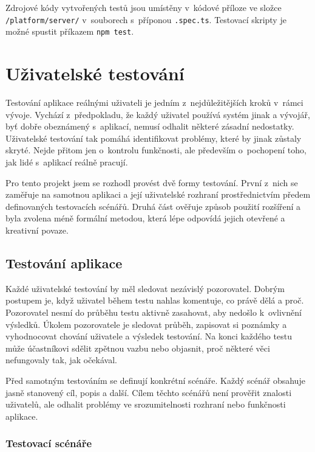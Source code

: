 Zdrojové kódy vytvořených testů jsou umístěny v~kódové příloze ve složce \texttt{/platform/server/} v~souborech s~příponou \verb|.spec.ts|.
Testovací skripty je možné spustit příkazem \verb|npm test|.


\section{Uživatelské testování}

Testování aplikace reálnými uživateli je jedním z~nejdůležitějších kroků v~rámci vývoje. 
Vychází z~předpokladu, že každý uživatel používá systém jinak a vývojář, byť dobře obeznámený s~aplikací, nemusí odhalit některé zásadní nedostatky. 
Uživatelské testování tak pomáhá identifikovat problémy, které by jinak zůstaly skryté. 
Nejde přitom jen o~kontrolu funkčnosti, ale především o~pochopení toho, jak lidé s~aplikací reálně pracují.

Pro tento projekt jsem se rozhodl provést dvě formy testování.
První z~nich se zaměřuje na samotnou aplikaci a její uživatelské rozhraní prostřednictvím předem definovaných testovacích scénářů. 
Druhá část ověřuje způsob použití rozšíření a byla zvolena méně formální metodou, která lépe odpovídá jejich otevřené a kreativní povaze.

\subsection{Testování aplikace}

Každé uživatelské testování by měl sledovat nezávislý pozorovatel. 
Dobrým postupem je, když uživatel během testu nahlas komentuje, co právě dělá a proč. 
Pozorovatel nesmí do průběhu testu aktivně zasahovat, aby nedošlo k~ovlivnění výsledků. 
Úkolem pozorovatele je sledovat průběh, zapisovat si poznámky a vyhodnocovat chování uživatele a výsledek testování. 
Na konci každého testu může účastníkovi sdělit zpětnou vazbu nebo objasnit, proč některé věci nefungovaly tak, jak očekával.

Před samotným testováním se definují konkrétní scénáře.
Každý scénář obsahuje jasně stanovený cíl, popis a další. 
Cílem těchto scénářů není prověřit znalosti uživatelů, ale odhalit problémy ve srozumitelnosti rozhraní nebo funkčnosti aplikace.

\subsubsection{Testovací scénáře}

